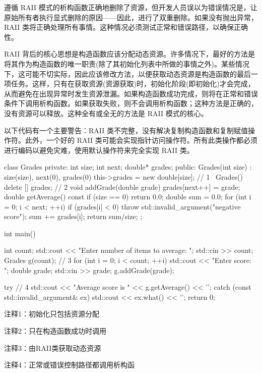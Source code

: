 遵循 RAII 模式的析构函数正确地删除了资源，但开发人员误以为错误情况是，让原始所有者执行显式删除的原因——因此，进行了双重删除。如果没有抛出异常，RAII 类将正确处理所有事情。这种情况必须测试正常和错误路径，以确保正确性。


RAII 背后的核心思想是构造函数应该分配动态资源。许多情况下，最好的方法是将其作为构造函数的唯一职责(除了其初始化列表中所做的事情之外)。某些情况下，这可能不切实际，因此应该修改方法，以便获取动态资源是构造函数的最后一项任务。这样，只有在获取资源(资源获取)时，初始化阶段(即初始化)才会完成，从而避免在出现异常时发生资源泄漏。如果构造函数成功完成，则将在正常和错误条件下调用析构函数。如果获取失败，则不会调用析构函数；这种方法是正确的，没有资源可以释放。这种全有或全无的方法是 RAII 模式的核心。

以下代码有一个主要警告：RAII 类不完整，没有解决复制构造函数和复制赋值操作符。此外，一个好的 RAII 类可能会实现指针访问操作符。所有此类操作都必须进行编码以避免灾难，使用默认操作符来完全实现 RAII 类。


\begin{cpp}
class Grades {
private:
  int size;
  int next;
  double* grades;
public:
  Grades(int size) : size(size), next(0), grades(0) {
    this->grades = new double[size]; // 1
  }
  ~Grades() { delete [] grades; } // 2
  void addGrade(double grade) { grades[next++] = grade; }
    double getAverage() const {
    if (size == 0)
      return 0.0;
    double sum = 0.0;
    for (int i = 0; i < next; ++i) {
      if (grades[i] < 0)
        throw std::invalid_argument("negative score");
      sum += grades[i];
    }
    return sum/size;
  }
};

int main() {
  int count;
  std::cout << "Enter number of items to average: ";
  std::cin >> count;
  Grades g(count); // 3
  for (int i = 0; i < count; ++i) {
    std::cout << "Enter score: ";
    double grade;
    std::cin >> grade;
    g.addGrade(grade);
  }

  try { // 4
    std::cout << "Average score is " << g.getAverage() << '\n';
  } catch (const std::invalid_argument& ex) {
    std::cout << ex.what() << '\n';
  }
  return 0;
}
\end{cpp}

{\footnotesize
注释1：初始化只包括资源分配

注释2：只在构造函数成功时调用

注释3：由RAII类获取动态资源

注释4：正常或错误控制路径都调用析构函
}

